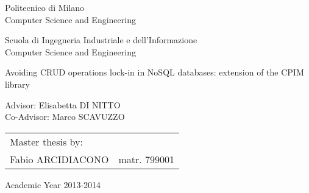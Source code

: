 \begin{titlepage}
\vspace*{-2.5cm}
\bfseries
\begin{center}
  \LARGE
  Politecnico di Milano\\
  \Large
  Computer Science and Engineering\\


\begin{large}
Scuola di Ingegneria Industriale e dell'Informazione\\
Computer Science and Engineering\\
\end{large}

\vspace{2.0cm}
\begin{Large}
Avoiding CRUD operations lock-in in NoSQL databases: extension of the CPIM library
\end{Large}  
\end{center}

\vspace*{4cm}
\large
\begin{flushleft}
\hspace{-2cm}  Advisor: Elisabetta DI NITTO\\
\hspace{-2cm}  Co-Advisor: Marco SCAVUZZO\\
\end{flushleft}
\vspace*{1.5cm}

\hspace{6cm}
\parbox{10cm}{
    \begin{tabular}{ll}
         Master thesis by: & \\
         Fabio ARCIDIACONO & matr. 799001\\
    \end{tabular}
}

\vspace*{2cm}
\begin{center}
  Academic Year 2013-2014
\end{center}

\end{titlepage}
\cleardoublepage

\thispagestyle{empty}

